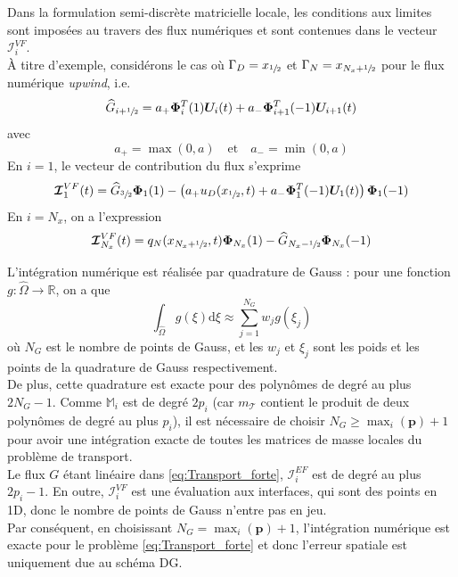 \documentclass[11pt, a4paper, oneside]{report}
\begin{document}
Dans la formulation semi-discrète matricielle locale, les conditions aux limites sont imposées au travers des flux numériques et sont contenues dans le vecteur $\bm{\mathcal{I}}_i^{VF}$. \\
À titre d'exemple, considérons le cas où $\Gamma_D = x_{\sfrac{1}{2}}$ et $\Gamma_N = x_{N_x + \sfrac{1}{2}}$ pour le flux numérique \textit{upwind}, i.e.
\begin{equation}
    \widehat{G}_{i + \sfrac{1}{2}} = a_+ \bm{\Phi}_i^T(1) \bm{U}_i(t) + a_- \bm{\Phi}_{i+1}^T(-1) \bm{U}_{i+1}(t)
\end{equation}
avec
\begin{equation}
    a_+ = \max(0, a) \quad \text{et} \quad a_- = \min(0, a)
\end{equation}
En $i = 1$, le vecteur de contribution du flux s'exprime
\begin{equation}
    \bm{\mathcal{I}}_1^{VF}(t) = \widehat{G}_{\sfrac{3}{2}} \bm{\Phi}_1(1) - \left(a_+ u_D(x_{\sfrac{1}{2}}, t) + a_- \bm{\Phi}_1^T(-1) \bm{U}_1(t) \right) \bm{\Phi}_1(-1)
\end{equation}
En $i = N_x$, on a l'expression
\begin{equation}
    \bm{\mathcal{I}}_{N_x}^{VF}(t) = q_N(x_{N_x + \sfrac{1}{2}}, t) \bm{\Phi}_{N_x}(1) - \widehat{G}_{N_x - \sfrac{1}{2}} \bm{\Phi}_{N_x}(-1)
\end{equation}

L'intégration numérique est réalisée par quadrature de Gauss : pour une fonction $g : \widehat{\Omega} \longrightarrow \mathbb{R}$, on a que
\begin{equation}
    \int_{\widehat{\Omega}} g(\xi) \text{d} \xi \approx \sum_{j = 1}^{N_G} w_j g(\xi_j)
\end{equation}
où $N_G$ est le nombre de points de Gauss, et les $w_j$ et $\xi_j$ sont les poids et les points de la quadrature de Gauss respectivement. \\
De plus, cette quadrature est exacte pour des polynômes de degré au plus $2N_G - 1$. Comme $\mathbb{M}_i$ est de degré $2p_i$ (car $m_\mathcal{T}$ contient le produit de deux polynômes de degré au plus $p_i$), il est nécessaire de choisir $N_G \geq \max_i(\mathbf{p}) + 1$ pour avoir une intégration exacte de toutes les matrices de masse locales du problème de transport. \\
Le flux $G$ étant linéaire dans \eqref{eq:Transport_forte}, $\bm{\mathcal{I}}_i^{EF}$ est de degré au plus $2p_i - 1$. En outre, $\bm{\mathcal{I}}_i^{VF}$ est une évaluation aux interfaces, qui sont des points en 1D, donc le nombre de points de Gauss n'entre pas en jeu. \\
Par conséquent, en choisissant $N_G = \max_i(\mathbf{p}) + 1$, l'intégration numérique est exacte pour le problème \eqref{eq:Transport_forte} et donc l'erreur spatiale est uniquement due au schéma DG. \\
\end{document}
